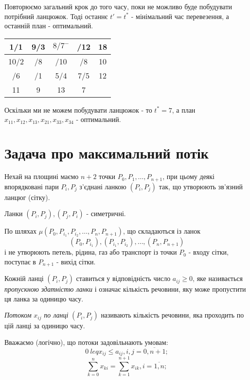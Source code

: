 \documentclass[12pt,a4paper]{book}
\newenvironment{slim_enumerate}{
\begin{enumerate}
  \setlength{\itemsep}{1pt}
  \setlength{\parskip}{0pt}
  \setlength{\parsep}{0pt}}
{\end{enumerate}}
\begin{document}
\begin{slim_enumerate}
Повторюємо загальний крок до того часу, поки не можливо буде побудувати потрібний ланцюжок. Тоді останнє $t'=t^*$ - мінімальний час перевезення, а останній план - оптимальний.\\
\begin{tabular}{ | c | c | c | c | c | }
\hline
1/1	&	9/3	&	$8/7^-$	&\cellcolor[rgb]{0.8,0.8,0.8}	/12	&	18\\
\hline
10/2	&\cellcolor[rgb]{0.8,0.8,0.8}	/8	&\cellcolor[rgb]{0.8,0.8,0.8}	/10	&\cellcolor[rgb]{0.8,0.8,0.8}	/8	&	10\\
\hline
/6	&	/1	&	5/4	&	7/5	&	12\\
\hline
11	&	9	&	13	&	7	&\\
\hline
\end{tabular}

Оскільки ми не можем побудувати ланцюжок - то $t^*=7$, а план $x_{11},x_{12},x_{13},x_{21},x_{33},x_{34}$ - оптимальний.
\end{slim_enumerate}

\section{Задача про максимальний потік}

Нехай на площині маємо $n+2$ точки $P_0, P_1, \dots, P_{n+1}$, при цьому деякі впорядковані пари $P_i, P_j$ з’єднані ланкою $(P_i, P_j)$ так, що утворюють зв’язний ланцюг (сітку).

Ланки $(P_i, P_j), (P_j, P_i)$ - симетричні.

По шляхах $\mu(P_0, P_{i_1}, P_{i_2}, \dots, P_n, P_{n+1})$, що складаються із ланок \[(P_0, P_{i_1}), (P_{i_1}, P_{i_2}), \dots, (P_n, P_{n+1})\] і не утворюють петель, рідина, газ або транспорт із точки $P_0$ - входу сітки, поступає в $P_{n+1}$ - вихід сітки.

Кожній ланці $(P_i, P_j)$ ставиться у відповідність число $a_{ij} \ge 0$, яке називається \emph{пропускною здатністю ланки} і означає кількість речовини, яку може пропустити ця ланка за одиницю часу.

\emph{Потоком} $x_{ij}$ \emph{по ланці} $(P_i, P_j)$ називають кількість речовини, яка проходить по цій ланці за одиницю часу.

Вважаємо (логічно), що потоки задовільнають умовам:
\begin{equation} 0 \ leq x_{ij} \le a_{ij}, i,j = \overline{0, n+1}; \label{eq:flowvol} \end{equation}
\begin{equation} \sum_{k=0}^n x_{ki} = \sum_{k=1}^{n+1} x_{ik}, i = \overline{1, n}; \label{eq:flowbalance} \end{equation}
\end{document}
